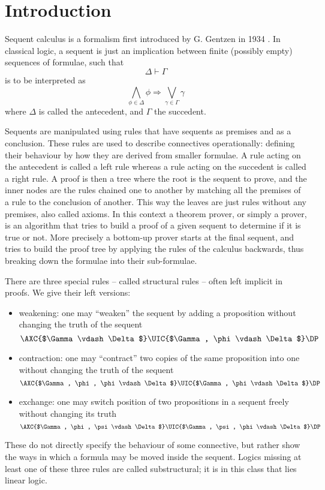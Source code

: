 \chapter{Introduction}\label{chapter:intro}
Sequent calculus is a formalism first introduced by G. Gentzen in 1934 \cite{Gentzen1935I, Gentzen1935II}.
In classical logic, a sequent is just an implication between finite (possibly empty) sequences of formulae, such that
$$ \Delta \vdash \Gamma $$ 
is to be interpreted as
$$ \bigwedge_{\phi \in \Delta} \phi \Rightarrow \bigvee_{\gamma \in \Gamma} \gamma $$
where $\Delta$ is called the antecedent, and $\Gamma$ the succedent.

Sequents are manipulated using rules that have sequents as premises and as a conclusion.
These rules are used to describe connectives operationally: defining their behaviour by how they are derived from smaller formulae.
A rule acting on the antecedent is called a left rule whereas a rule acting on the succedent is called a right rule.
A proof is then a tree where the root is the sequent to prove, and the inner nodes are the rules chained one to another by matching all the premises of a rule to the conclusion of another.
This way the leaves are just rules without any premises, also called axioms.
In this context a theorem prover, or simply a prover, is an algorithm that tries to build a proof of a given sequent to determine if it is true or not.
More precisely a bottom-up prover starts at the final sequent, and tries to build the proof tree by applying the rules of the calculus backwards, thus breaking down the formulae into their sub-formulae.

There are three special rules -- called structural rules -- often left implicit in proofs.
We give their left versions:
\begin{itemize}
	\item weakening: one may ``weaken'' the sequent by adding a proposition without changing the truth of the sequent
		$$
		\AXC{$\Gamma \vdash \Delta$}
		\UIC{$\Gamma, \phi \vdash \Delta$}
		\DP
		$$
	\item contraction: one may ``contract'' two copies of the same proposition into one without changing the truth of the sequent
		$$
		\AXC{$\Gamma, \phi, \phi \vdash \Delta$}
		\UIC{$\Gamma, \phi \vdash \Delta$}
		\DP
		$$
	\item exchange: one may switch position of two propositions in a sequent freely without changing its truth
		$$
		\AXC{$\Gamma, \phi, \psi \vdash \Delta$}
		\UIC{$\Gamma, \psi, \phi \vdash \Delta$}
		\DP
		$$
\end{itemize}
These do not directly specify the behaviour of some connective, but rather show the ways in which a formula may be moved inside the sequent.
Logics missing at least one of these three rules are called substructural; it is in this class that lies linear logic.

